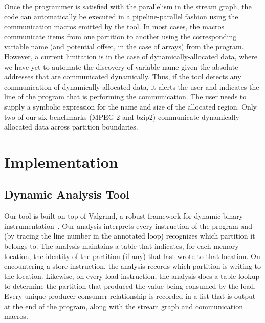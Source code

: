 Once the programmer is satisfied with the parallelism in the stream
graph, the code can automatically be executed in a pipeline-parallel
fashion using the communication macros emitted by the tool.  In most
cases, the macros communicate items from one partition to another
using the corresponding variable name (and potential offset, in the
case of arrays) from the program.  However, a current limitation is in
the case of dynamically-allocated data, where we have yet to automate
the discovery of variable name given the absolute addresses that are
communicated dynamically.  Thus, if the tool detects any communication
of dynamically-allocated data, it alerts the user and indicates the
line of the program that is performing the communication.  The user
needs to supply a symbolic expression for the name and size of the
allocated region.  Only two of our six benchmarks (MPEG-2 and bzip2)
communicate dynamically-allocated data across partition boundaries.
%
%

\section{Implementation}
\label{sec:parallelization}

\subsection*{Dynamic Analysis Tool}

Our tool is built on top of Valgrind, a robust framework for dynamic
binary instrumentation~\cite{nethercote07valgrind}.  Our analysis
interprets every instruction of the program and (by tracing the line
number in the annotated loop) recognizes which partition it belongs
to.  The analysis maintains a table that indicates, for each memory
location, the identity of the partition (if any) that last wrote to
that location.  On encountering a store instruction, the analysis
records which partition is writing to the location.  Likewise, on
every load instruction, the analysis does a table lookup to determine
the partition that produced the value being consumed by the load.
Every unique producer-consumer relationship is recorded in a list that
is output at the end of the program, along with the stream graph and
communication macros.

